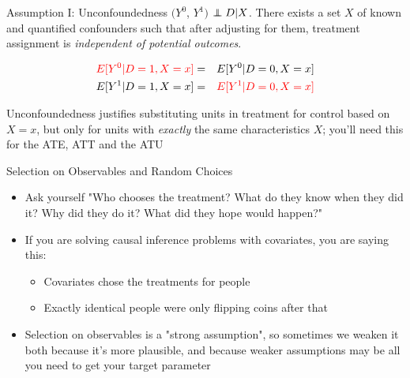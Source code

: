 \documentclass{beamer}
\newcommand\independent{\protect\mathpalette{\protect\independenT}{\perp}}
\def\independenT#1#2{\mathrel{\rlap{$#1#2$}\mkern2mu{#1#2}}}
\begin{document}
\begin{frame}[plain]

	\begin{block}{Assumption I: Unconfoundedness}
	$(Y^0$, $Y^1)$ $\independent{D} | X$. There exists a set $X$ of known and quantified confounders such that after adjusting for them, treatment assignment is \emph{independent of potential outcomes}.
	\end{block}
	
	\begin{eqnarray*}
	\textcolor{red}{E[Y^0 | D=1, X=x]} &=& E[Y^0 | D=0, X=x] \\
	E[Y^1 | D=1, X=x] &=& \textcolor{red}{E[Y^1 | D=0, X=x] }
	\end{eqnarray*}
	
Unconfoundedness justifies substituting units in treatment for control based on $X=x$, but only for units with \emph{exactly} the same characteristics $X$; you'll need this for the ATE, ATT and the ATU
	
	
\end{frame}

\begin{frame}{Selection on Observables and Random Choices}

\begin{itemize}
\item Ask yourself "Who chooses the treatment?  What do they know when they did it?  Why did they do it? What did they hope would happen?"
\item If you are solving causal inference problems with covariates, you are saying this:
	\begin{itemize}
	\item Covariates chose the treatments for people
	\item Exactly identical people were only flipping coins after that
	\end{itemize}
\item Selection on observables is a "strong assumption", so sometimes we weaken it both because it's more plausible, and because weaker assumptions may be all you need to get your target parameter

\end{itemize}

\end{frame}
\end{document}
